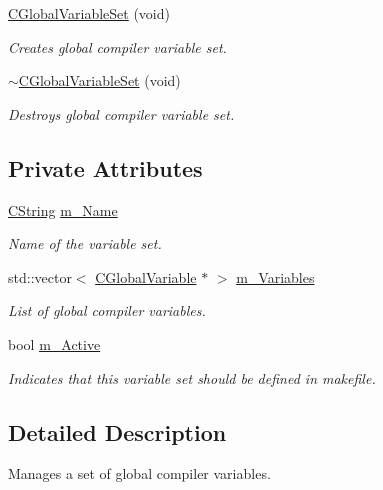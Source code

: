 \begin{DoxyCompactItemize}
\hyperlink{classCGlobalVariableSet_a13c8d52e689d92bcafca84167fc8a4c0}{C\-Global\-Variable\-Set} (void)
\begin{DoxyCompactList}\small\item\em Creates global compiler variable set. \end{DoxyCompactList}\item 
\hyperlink{classCGlobalVariableSet_ab03bd8020475f2bb341dbc82ec9d0837}{$\sim$\-C\-Global\-Variable\-Set} (void)
\begin{DoxyCompactList}\small\item\em Destroys global compiler variable set. \end{DoxyCompactList}\end{DoxyCompactItemize}
\subsection*{Private Attributes}
\begin{DoxyCompactItemize}
\item 
\hyperlink{classCString}{C\-String} \hyperlink{classCGlobalVariableSet_ac843c7965c6986d37b163b82250de04c}{m\-\_\-\-Name}
\begin{DoxyCompactList}\small\item\em Name of the variable set. \end{DoxyCompactList}\item 
std\-::vector$<$ \hyperlink{classCGlobalVariable}{C\-Global\-Variable} $\ast$ $>$ \hyperlink{classCGlobalVariableSet_ab9e5a9983873c06218132833a870e36a}{m\-\_\-\-Variables}
\begin{DoxyCompactList}\small\item\em List of global compiler variables. \end{DoxyCompactList}\item 
bool \hyperlink{classCGlobalVariableSet_a3505dd291a7e3ed49faef044b74212ea}{m\-\_\-\-Active}
\begin{DoxyCompactList}\small\item\em Indicates that this variable set should be defined in makefile. \end{DoxyCompactList}\end{DoxyCompactItemize}


\subsection{Detailed Description}
Manages a set of global compiler variables. 

